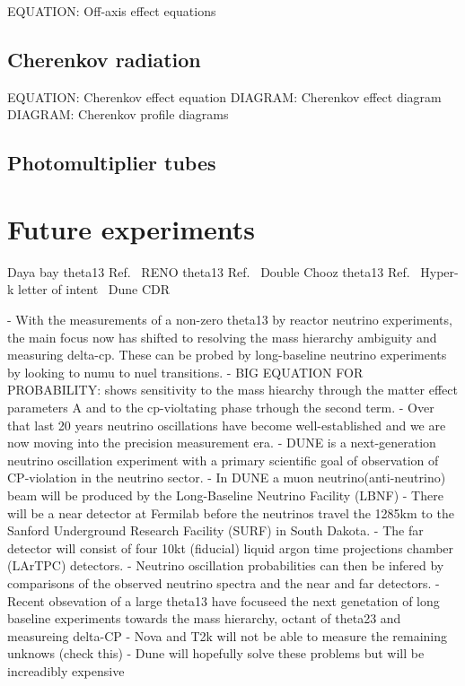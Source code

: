 EQUATION: Off-axis effect equations

\subsection{Cherenkov radiation} %
\label{sec:exp_long_cherenkov} %

EQUATION: Cherenkov effect equation
DIAGRAM: Cherenkov effect diagram
DIAGRAM: Cherenkov profile diagrams

\subsection{Photomultiplier tubes} %
\label{sec:exp_long_pmts} %

\section{Future experiments} %
\label{sec:exp_future} %

Daya bay theta13 Ref.~\cite{an2012}
RENO theta13 Ref.~\cite{ahn2012}
Double Chooz theta13 Ref.~\cite{abe2012}
Hyper-k letter of intent~\cite{abe2011}
Dune CDR~\cite{acciarri2016}

- With the measurements of a non-zero theta13 by reactor neutrino experiments, the main focus now
has shifted to resolving the mass hierarchy ambiguity and measuring delta-cp. These can be probed
by long-baseline neutrino experiments by looking to numu to nuel transitions.
- BIG EQUATION FOR PROBABILITY: shows sensitivity to the mass hiearchy through the matter effect
parameters A and to the cp-violtating phase trhough the second term.
- Over that last 20 years neutrino oscillations have become well-established and we are now moving
into the precision measurement era.
- DUNE is a next-generation neutrino oscillation experiment with a primary scientific goal of
observation of CP-violation in the neutrino sector.
- In DUNE a muon neutrino(anti-neutrino) beam will be produced by the Long-Baseline Neutrino
Facility (LBNF)
- There will be a near detector at Fermilab before the neutrinos travel the 1285km to the Sanford
Underground Research Facility (SURF) in South Dakota.
- The far detector will consist of four 10kt (fiducial) liquid argon time projections chamber
(LArTPC) detectors.
- Neutrino oscillation probabilities can then be infered by comparisons of the observed neutrino
spectra and the near and far detectors.
- Recent obsevation of a large theta13 have focuseed the next genetation of long baseline
experiments towards the mass hierarchy, octant of theta23 and measureing delta-CP
- Nova and T2k will not be able to measure the remaining unknows (check this)
- Dune will hopefully solve these problems but will be increadibly expensive

